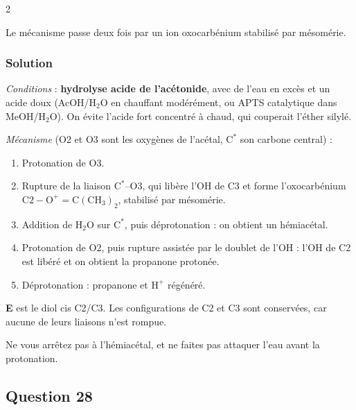 \documentclass[11pt,a4paper]{article}
\providecommand{\tightlist}{\setlength{\itemsep}{0pt}\setlength{\parskip}{0pt}}
\begin{document}
\begin{indication}{2}

Le mécanisme passe deux fois par un ion oxocarbénium stabilisé par mésomérie.

\end{indication}

\hypertarget{solution-26}{%
\subsubsection{Solution}\label{solution-26}}

\emph{Conditions} : \textbf{hydrolyse acide de l'acétonide}, avec de l'eau en excès et un acide doux (AcOH/\(\mathrm{H_2O}\) en chauffant modérément, ou APTS catalytique dans MeOH/\(\mathrm{H_2O}\)). On évite l'acide fort concentré à chaud, qui couperait l'éther silylé.

\emph{Mécanisme} (O2 et O3 sont les oxygènes de l'acétal, \(\mathrm{C^*}\) son carbone central) :

\begin{enumerate}
\def\labelenumi{\arabic{enumi}.}
\tightlist
\item
  Protonation de O3.
\item
  Rupture de la liaison \(\mathrm{C^*}\)--O3, qui libère l'OH de C3 et forme l'oxocarbénium \(\mathrm{C2{-}O^+{=}C(CH_3)_2}\), stabilisé par mésomérie.
\item
  Addition de \(\mathrm{H_2O}\) sur \(\mathrm{C^*}\), puis déprotonation : on obtient un hémiacétal.
\item
  Protonation de O2, puis rupture assistée par le doublet de l'OH : l'OH de C2 est libéré et on obtient la propanone protonée.
\item
  Déprotonation : propanone et \(\mathrm{H^+}\) régénéré.
\end{enumerate}

\textbf{E} est le diol cis C2/C3. Les configurations de C2 et C3 sont conservées, car aucune de leurs liaisons n'est rompue.

\begin{piege}

Ne vous arrêtez pas à l'hémiacétal, et ne faites pas attaquer l'eau avant la protonation.

\end{piege}

\hypertarget{question-28}{%
\subsection{Question 28}\label{question-28}}
\end{document}
